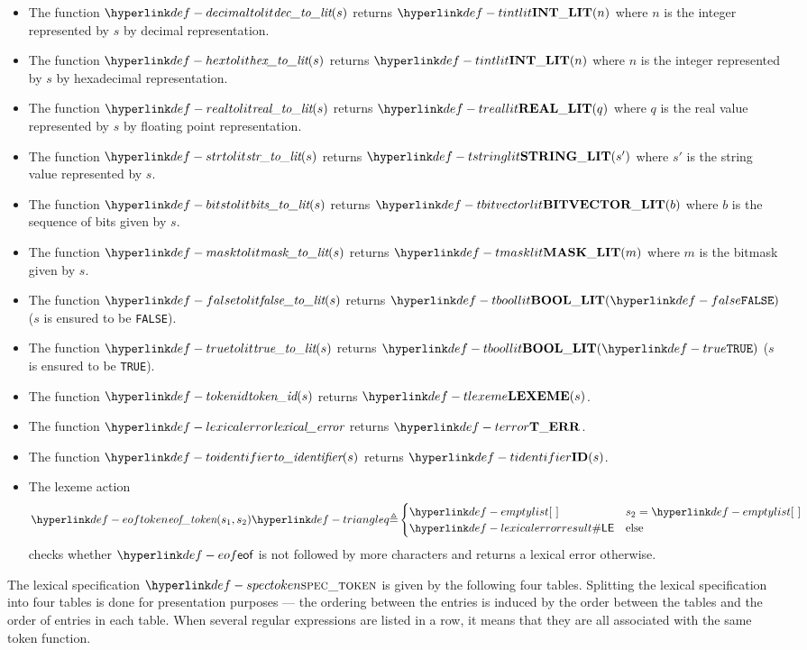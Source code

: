 \begin{itemize}
\hypertarget{def-decimaltolit}{}
\item The function $\decimaltolit(s)$ returns $\Tintlit(n)$ where $n$ is the integer represented by $s$
by decimal representation.
\hypertarget{def-hextolit}{}
\item The function $\hextolit(s)$ returns $\Tintlit(n)$ where $n$ is the integer represented by $s$
by hexadecimal representation.
\hypertarget{def-realtolit}{}
\item The function $\realtolit(s)$ returns $\Treallit(q)$ where $q$ is the real value represented by $s$
by floating point representation.
\hypertarget{def-strtolit}{}
\item The function $\strtolit(s)$ returns $\Tstringlit(s')$ where $s'$ is the string value represented by $s$.
\hypertarget{def-bitstolit}{}
\item The function $\bitstolit(s)$ returns $\Tbitvectorlit(b)$ where $b$ is the sequence of bits
given by $s$.
\hypertarget{def-masktolit}{}
\item The function $\masktolit(s)$ returns $\Tmasklit(m)$ where $m$ is the bitmask given by $s$.
\hypertarget{def-falsetolit}{}
\item The function $\falsetolit(s)$ returns $\Tboollit(\False)$ ($s$ is ensured to be \texttt{FALSE}).
\hypertarget{def-truetolit}{}
\item The function $\truetolit(s)$ returns $\Tboollit(\True)$ ($s$ is ensured to be \texttt{TRUE}).
\hypertarget{def-tokenid}{}
\item The function $\tokenid(s)$ returns $\Tlexeme(s)$.
\hypertarget{def-lexicalerror}{}
\item The function $\lexicalerror$ returns $\Terror$.
\hypertarget{def-toidentifier}{}
\item The function $\toidentifier(s)$ returns $\Tidentifier(s)$.
\hypertarget{def-eoftoken}{}
\item The lexeme action
\[
\eoftoken(s_1, s_2) \triangleq \begin{cases}
  \emptylist & s_2 = \emptylist\\
  \LexicalError & \text{else}
\end{cases}
\]
checks whether $\eof$ is not followed by more characters and returns a lexical error otherwise.
\end{itemize}

\hypertarget{def-spectoken}{}
The lexical specification  $\spectoken$ is given by the following four tables.
Splitting the lexical specification into four tables is done for presentation purposes ---
the ordering between the entries is induced by the order between the tables
and the order of entries in each table.
%
When several regular expressions are listed in a row, it means that they are all associated with the same
token function.

